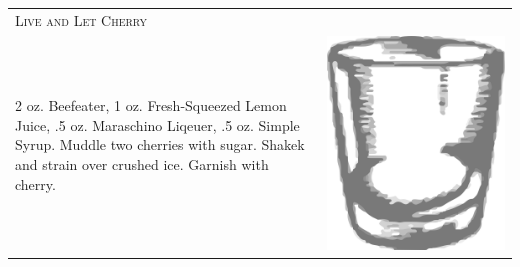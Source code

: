 \documentclass{article}
\begin{document}
\begin{tabular}{p{2in} p{0.5in}}
	\multicolumn{2}{p{3in}}{\centering\Huge\textsc{Live and Let Cherry}} \\ 
	   \vspace{-0.1in}2 oz. Beefeater, 1 oz. Fresh-Squeezed Lemon Juice, .5 oz. Maraschino Liqeuer, .5 oz. Simple Syrup. Muddle two cherries with sugar. Shakek and strain over crushed ice. Garnish with cherry. &
	   \vspace{-0.1in} \includegraphics{rocks_glass.png}
\end{tabular}
\end{document}
